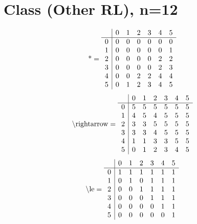 \documentclass[11pt]{article}
\begin{document}
\section{Class (Other RL), n=12}
\[\text{*} = 
\begin{array}{r | r r r r r r}
 & 0 & 1 & 2 & 3 & 4 & 5 \\ \hline
0 & 0 & 0 & 0 & 0 & 0 & 0 \\
1 & 0 & 0 & 0 & 0 & 0 & 1 \\
2 & 0 & 0 & 0 & 0 & 2 & 2 \\
3 & 0 & 0 & 0 & 0 & 2 & 3 \\
4 & 0 & 0 & 2 & 2 & 4 & 4 \\
5 & 0 & 1 & 2 & 3 & 4 & 5 \\
\end{array}
\]
\[\text{\textbackslash rightarrow} = 
\begin{array}{r | r r r r r r}
 & 0 & 1 & 2 & 3 & 4 & 5 \\ \hline
0 & 5 & 5 & 5 & 5 & 5 & 5 \\
1 & 4 & 5 & 4 & 5 & 5 & 5 \\
2 & 3 & 3 & 5 & 5 & 5 & 5 \\
3 & 3 & 3 & 4 & 5 & 5 & 5 \\
4 & 1 & 1 & 3 & 3 & 5 & 5 \\
5 & 0 & 1 & 2 & 3 & 4 & 5 \\
\end{array}
\]
\[\text{\textbackslash le} = 
\begin{array}{r | r r r r r r}
 & 0 & 1 & 2 & 3 & 4 & 5 \\ \hline
0 & 1 & 1 & 1 & 1 & 1 & 1 \\
1 & 0 & 1 & 0 & 1 & 1 & 1 \\
2 & 0 & 0 & 1 & 1 & 1 & 1 \\
3 & 0 & 0 & 0 & 1 & 1 & 1 \\
4 & 0 & 0 & 0 & 0 & 1 & 1 \\
5 & 0 & 0 & 0 & 0 & 0 & 1 \\
\end{array}
\]
\end{document}
